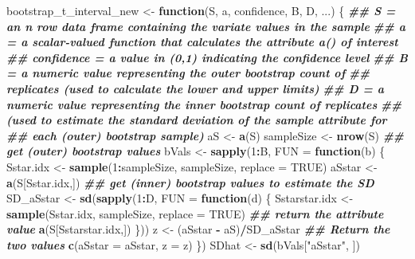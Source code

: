 \documentclass[
]{article}
\newenvironment{Shaded}{\begin{snugshade}}{\end{snugshade}}
\newcommand{\AttributeTok}[1]{\textcolor[rgb]{0.13,0.29,0.53}{#1}}
\newcommand{\ConstantTok}[1]{\textcolor[rgb]{0.56,0.35,0.01}{#1}}
\newcommand{\ControlFlowTok}[1]{\textcolor[rgb]{0.13,0.29,0.53}{\textbf{#1}}}
\newcommand{\DecValTok}[1]{\textcolor[rgb]{0.00,0.00,0.81}{#1}}
\newcommand{\DocumentationTok}[1]{\textcolor[rgb]{0.56,0.35,0.01}{\textbf{\textit{#1}}}}
\newcommand{\FunctionTok}[1]{\textcolor[rgb]{0.13,0.29,0.53}{\textbf{#1}}}
\newcommand{\NormalTok}[1]{#1}
\newcommand{\OtherTok}[1]{\textcolor[rgb]{0.56,0.35,0.01}{#1}}
\newcommand{\SpecialCharTok}[1]{\textcolor[rgb]{0.81,0.36,0.00}{\textbf{#1}}}
\newcommand{\StringTok}[1]{\textcolor[rgb]{0.31,0.60,0.02}{#1}}
\begin{document}
\begin{Shaded}
\begin{Highlighting}[]
\NormalTok{bootstrap\_t\_interval\_new }\OtherTok{\textless{}{-}} \ControlFlowTok{function}\NormalTok{(S, a, confidence, B, D, ...) \{}
  \DocumentationTok{\#\# S = an n row data frame containing the variate values in the sample}
  \DocumentationTok{\#\# a = a scalar{-}valued function that calculates the attribute a() of interest}
  \DocumentationTok{\#\# confidence = a value in (0,1) indicating the confidence level}
  \DocumentationTok{\#\# B = a numeric value representing the outer bootstrap count of}
  \DocumentationTok{\#\# replicates (used to calculate the lower and upper limits)}
  \DocumentationTok{\#\# D = a numeric value representing the inner bootstrap count of replicates}
  \DocumentationTok{\#\# (used to estimate the standard deviation of the sample attribute for}
  \DocumentationTok{\#\# each (outer) bootstrap sample)}
\NormalTok{  aS }\OtherTok{\textless{}{-}} \FunctionTok{a}\NormalTok{(S)}
\NormalTok{  sampleSize }\OtherTok{\textless{}{-}} \FunctionTok{nrow}\NormalTok{(S)}
  \DocumentationTok{\#\# get (outer) bootstrap values}
\NormalTok{  bVals }\OtherTok{\textless{}{-}} \FunctionTok{sapply}\NormalTok{(}\DecValTok{1}\SpecialCharTok{:}\NormalTok{B, }\AttributeTok{FUN =} \ControlFlowTok{function}\NormalTok{(b) \{}
\NormalTok{    Sstar.idx }\OtherTok{\textless{}{-}} \FunctionTok{sample}\NormalTok{(}\DecValTok{1}\SpecialCharTok{:}\NormalTok{sampleSize, sampleSize, }\AttributeTok{replace =} \ConstantTok{TRUE}\NormalTok{)}
\NormalTok{    aSstar }\OtherTok{\textless{}{-}} \FunctionTok{a}\NormalTok{(S[Sstar.idx,])}
    \DocumentationTok{\#\# get (inner) bootstrap values to estimate the SD}
\NormalTok{    SD\_aSstar }\OtherTok{\textless{}{-}} \FunctionTok{sd}\NormalTok{(}\FunctionTok{sapply}\NormalTok{(}\DecValTok{1}\SpecialCharTok{:}\NormalTok{D, }\AttributeTok{FUN =} \ControlFlowTok{function}\NormalTok{(d) \{}
\NormalTok{    Sstarstar.idx }\OtherTok{\textless{}{-}} \FunctionTok{sample}\NormalTok{(Sstar.idx, sampleSize, }\AttributeTok{replace =} \ConstantTok{TRUE}\NormalTok{)}
    \DocumentationTok{\#\# return the attribute value}
    \FunctionTok{a}\NormalTok{(S[Sstarstar.idx,])}
\NormalTok{    \}))}
\NormalTok{    z }\OtherTok{\textless{}{-}}\NormalTok{ (aSstar }\SpecialCharTok{{-}}\NormalTok{ aS)}\SpecialCharTok{/}\NormalTok{SD\_aSstar}
    \DocumentationTok{\#\# Return the two values}
    \FunctionTok{c}\NormalTok{(}\AttributeTok{aSstar =}\NormalTok{ aSstar, }\AttributeTok{z =}\NormalTok{ z)}
\NormalTok{  \})}
\NormalTok{  SDhat }\OtherTok{\textless{}{-}} \FunctionTok{sd}\NormalTok{(bVals[}\StringTok{"aSstar"}\NormalTok{, ])}

\end{Highlighting}
\end{Shaded}
\end{document}
